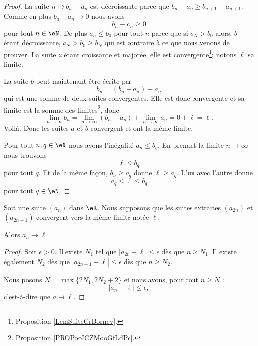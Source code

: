 \begin{proof}
	La suite \( n\mapsto b_n-a_n\) est décroissante parce que \( b_n-a_n\geq b_{n+1}-a_{n+1}\). Comme en plus \( b_a-a_n\to 0\) nous avons
	\begin{equation}
		b_n-a_n\geq 0
	\end{equation}
	pour tout \( n\in \eN\). De plus \( a_n\leq b_0\) pour tout \( n\) parce que si \( a_N>b_0\) alors, \( b\) étant décroissante, \( a_N>b_0\geq b_N\) qui est contraire à ce que nous venons de prouver. La suite \( a\) étant croissante et majorée, elle est convergente\footnote{Proposition \ref{LemSuiteCrBorncv}.}; notons \( \ell\) sa limite.

	La suite \( b\) peut maintenant être écrite par
	\begin{equation}
		b_n=(b_n-a_n)+a_n
	\end{equation}
	qui est une somme de deux suites convergentes. Elle est donc convergente et sa limite est la somme des limites\footnote{Proposition \ref{PROPooICZMooGfLdPc}.}, donc
	\begin{equation}
		\lim_{n\to \infty} b_n=\lim_{n\to \infty} (b_n-a_n)+\lim_{n\to \infty} a_n = 0+\ell=\ell.
	\end{equation}
	Voilà. Donc les suites \( a\) et \( b\) convergent et ont la même limite.

	Pour tout \( n,q\in \eN\) nous avons l'inégalité \( a_n\leq b_q\). En prenant la limite \( n\to \infty\) nous trouvons
	\begin{equation}
		\ell\leq b_q
	\end{equation}
	pour tout \( q\). Et de la même façon, \( b_n\geq a_q\) donne \( \ell\geq a_q\). L'un avec l'autre donne
	\begin{equation}
		a_q\leq \ell\leq b_q
	\end{equation}
	pour tout \( q\in \eN\).
\end{proof}

\begin{proposition}      \label{PROPooXOOCooGMqJNe}
	Soit une suite \( (a_n)\) dans \( \eR\).  Nous supposons que les suites extraites \( (a_{2n})\) et \( (a_{2n+1})\) convergent vers la même limite notée \( \ell\).

	Alors \( a_n\to \ell\).
\end{proposition}

\begin{proof}
	Soit \( \epsilon>0\). Il existe \( N_1\) tel que \( | a_{2n}-\ell |\leq \epsilon\) dès que \( n\geq N_1\). Il existe également \( N_2\) dès que \( | a_{2n+1}-\ell |\leq \epsilon\) dès que \( n\geq N_2\).

	Nous posons \( N=\max\{ 2N_1,2N_2+2 \}\) et nous avons, pour tout \( n\geq N\) :
	\begin{equation}
		| a_n-\ell |\leq \epsilon,
	\end{equation}
	c'est-à-dire que \( a\to \ell\).
\end{proof}

